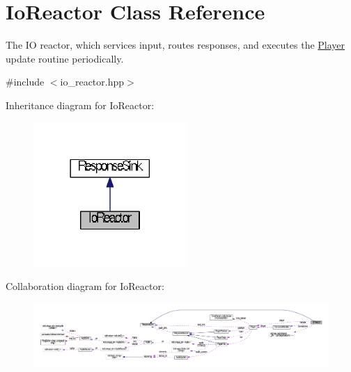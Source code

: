 \hypertarget{classIoReactor}{\section{Io\+Reactor Class Reference}
\label{classIoReactor}
}


The I\+O reactor, which services input, routes responses, and executes the \hyperlink{classPlayer}{Player} update routine periodically.  




{\ttfamily \#include $<$io\+\_\+reactor.\+hpp$>$}



Inheritance diagram for Io\+Reactor\+:
\nopagebreak
\begin{figure}[H]
\begin{center}
\leavevmode
\includegraphics[width=165pt]{classIoReactor__inherit__graph}
\end{center}
\end{figure}


Collaboration diagram for Io\+Reactor\+:
\nopagebreak
\begin{figure}[H]
\begin{center}
\leavevmode
\includegraphics[width=350pt]{classIoReactor__coll__graph}
\end{center}
\end{figure}
